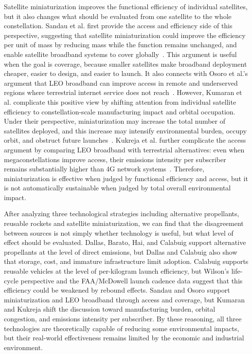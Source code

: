 \documentclass[12pt]{article}
\begin{document}
Satellite miniaturization improves the functional efficiency of individual satellites, but it also changes what should be evaluated from one satellite to the whole constellation. Sandau et al. first provide the access and efficiency side of this perspective, suggesting that satellite miniaturization could improve the efficiency per unit of mass by reducing mass while the function remains unchanged, and enable satellite broadband systems to cover globally~\citep{sandau2010smallsat}. This argument is useful when the goal is coverage, because smaller satellites make broadband deployment cheaper, easier to design, and easier to launch. It also connects with Osoro et al.'s argument that LEO broadband can improve access in remote and underserved regions where terrestrial internet service does not reach~\citep{osoro2025leo}. However, Kumaran et al. complicate this positive view by shifting attention from individual satellite efficiency to constellation-scale manufacturing impact and orbital occupation. Under their perspective, miniaturization may increase the total number of satellites deployed, and this increase may intensify environmental burden, occupy orbit, and obstruct future launches~\citep{kumaran2024manufacturing}. Kukreja et al. further complicate the access argument by comparing LEO broadband with terrestrial alternatives: even when megaconstellations improve access, their emissions intensity per subscriber remains substantially higher than 4G network systems~\citep{kukreja2025leo}. Therefore, miniaturization is effective when judged by functional efficiency and access, but it is not automatically sustainable when judged by total overall environmental impact.



After analyzing three technological strategies including alternative propellants, reusable rockets and satellite miniaturization, we can find that the disagreement between sources is not simply whether technology is useful, but what level of effect should be evaluated. Dallas, Barato, Hai, and Calabuig support alternative propellants at the level of direct emissions, but Dallas and Calabuig also show that storage, cost, and immature infrastructure limit adoption. Calabuig supports reusable vehicles at the level of per-kilogram launch efficiency, but Wilson's life-cycle perspective and the FAA/McDowell launch cadence data suggest that this efficiency could be weakened by rebound effects. Sandau and Osoro support miniaturization and LEO broadband through access and coverage, but Kumaran and Kukreja shift the discussion toward manufacturing burden, orbital congestion, and emissions intensity per subscriber. By these reasoning, all three technologies are theoretically capable of reducing some environmental impacts, but their real-world effectiveness remains limited by the economic and industrial environment.
\end{document}
